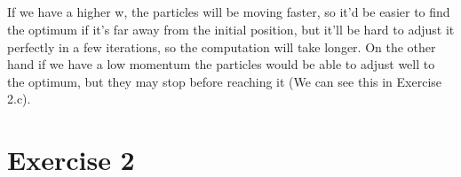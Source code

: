 \documentclass{scrartcl}
\begin{document}
\subsection{}
If we have a higher w, the particles will be moving faster, so it'd be easier to find the optimum if it's far away from the initial position, but it'll be hard to adjust it perfectly in a few iterations, so the computation will take longer.
On the other hand if we have a low momentum the particles would be able to adjust well to the optimum, but they may stop before reaching it (We can see this in Exercise 2.c).

\section{Exercise 2}
\end{document}
